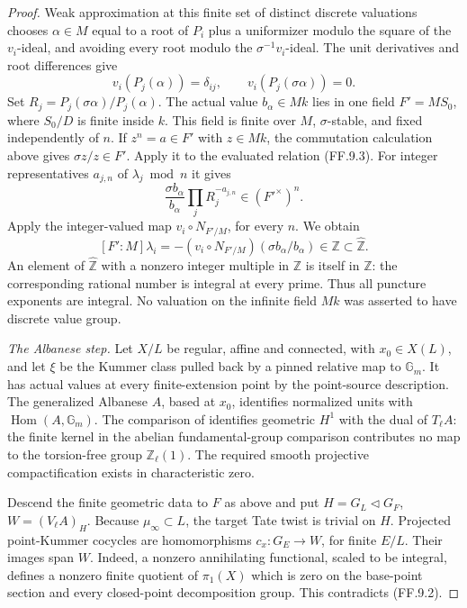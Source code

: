\begin{proof}
Weak approximation at this finite set of distinct discrete
valuations chooses \(\alpha\in M\) equal to a root of \(P_i\)
plus a uniformizer modulo the square of the \(v_i\)-ideal, and
avoiding every root modulo the \(\sigma^{-1}v_i\)-ideal.
The unit derivatives and root differences give
\[
 v_i(P_j(\alpha))=\delta_{ij},\qquad
 v_i(P_j(\sigma\alpha))=0.                               \tag{FF.9.4}
\]
Set \(R_j=P_j(\sigma\alpha)/P_j(\alpha)\). The actual value
\(b_\alpha\in Mk\) lies in one field \(F'=MS_0\), where
\(S_0/D\) is finite inside \(k\). This field is finite over
\(M\), \(\sigma\)-stable, and fixed independently of \(n\).
If \(z^n=a\in F'\) with \(z\in Mk\), the commutation
calculation above gives \(\sigma z/z\in F'\). Apply it to
the evaluated relation (FF.9.3). For integer representatives
\(a_{j,n}\) of \(\lambda_j\bmod n\) it gives
\[
 \frac{\sigma b_\alpha}{b_\alpha}
       \prod_jR_j^{-a_{j,n}}\in(F'^\times)^n.
\]
Apply the integer-valued map \(v_i\circ N_{F'/M}\), for every
\(n\). We obtain
\[
 [F':M]\lambda_i
       =-(v_i\circ N_{F'/M})(\sigma b_\alpha/b_\alpha)
                     \in\mathbb Z\subset\widehat{\mathbb Z}.
                                                               \tag{FF.9.5}
\]
An element of \(\widehat{\mathbb Z}\) with a nonzero integer
multiple in \(\mathbb Z\) is itself in \(\mathbb Z\): the
corresponding rational number is integral at every prime. Thus
all puncture exponents are integral. No valuation on the infinite
field \(Mk\) was asserted to have discrete value group.

\emph{The Albanese step.}
Let \(X/L\) be regular, affine and connected, with
\(x_0\in X(L)\), and let \(\xi\) be the Kummer class pulled
back by a pinned relative map to \(\mathbb G_m\). It has actual
values at every finite-extension point by the point-source
description. The generalized Albanese \(A\), based at \(x_0\),
identifies normalized units with \(\operatorname{Hom}(A,\mathbb G_m)\).
The comparison of \citet[Section~3, Proposition~4.1,
Corollary~4.2, Proposition~4.3]{FF_SpiessSzamuely2003} identifies
geometric \(H^1\) with the dual of \(T_\ell A\): the finite
kernel in the abelian fundamental-group comparison contributes
no map to the torsion-free group \(\mathbb Z_\ell(1)\).
The required smooth projective compactification exists in
characteristic zero.

Descend the finite geometric data to \(F\) as above and put
\(H=G_L\triangleleft G_F\), \(W=(V_\ell A)_H\). Because
\(\mu_\infty\subset L\), the target Tate twist is trivial
on \(H\). Projected point-Kummer cocycles are homomorphisms
\(c_x:G_E\to W\), for finite \(E/L\). Their images span \(W\).
Indeed, a nonzero annihilating functional, scaled to be integral,
defines a nonzero finite quotient of \(\pi_1(X)\) which is zero
on the base-point section and every closed-point decomposition
group. This contradicts (FF.9.2).


\end{proof}
